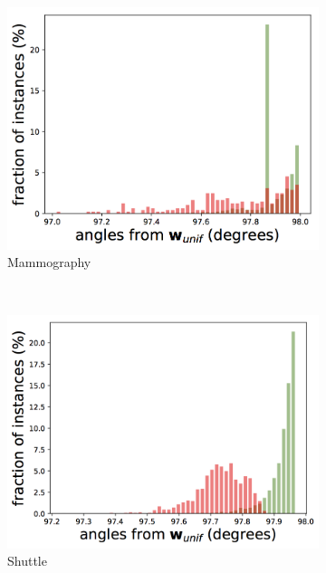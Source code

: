 \documentclass{article} %
\begin{document}
\begin{figure}[h]
\begin{subfigure}[b]{0.23\textwidth}
		\includegraphics[width=\textwidth]{angles/angles_mammography_iforest.png}
		\caption{Mammography}
		\label{fig:angles_mammography}
	\end{subfigure}
	~
	\begin{subfigure}[b]{0.23\textwidth}
		\includegraphics[width=\textwidth]{angles/angles_shuttle_1v23567_iforest.png}
		\caption{Shuttle}
		\label{fig:angles_shuttle}
	\end{subfigure} \\
	\begin{subfigure}[b]{0.23\textwidth}

\end{subfigure}
\end{figure}
\end{document}
